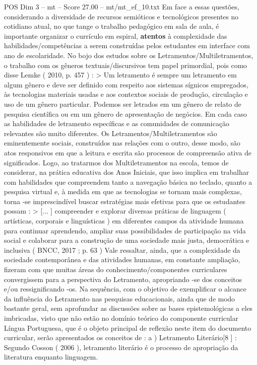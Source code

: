 \begin{textsample}{POS Dim 3 – mt – Score 27.00 – mt/mt\_ef\_10.txt}
Em face a essas questões, considerando a diversidade de recursos semióticos e tecnológicos presentes no cotidiano atual, no que tange o trabalho pedagógico em sala de aula, é importante organizar o currículo em espiral, \textbf{atentos} à complexidade das habilidades/competências a serem construídas pelos estudantes em interface com ano de escolaridade.
No bojo dos estudos sobre os Letramentos/Multiletramentos, o trabalho com os gêneros textuais/discursivos tem papel primordial, pois como disse Lemke ( 2010, p. 457 ) : > Um letramento é sempre um letramento em algum gênero e deve ser definido com respeito aos sistemas sígnicos empregados, às tecnologias materiais usadas e aos contextos sociais de produção, circulação e uso de um gênero particular.
Podemos ser letrados em um gênero de relato de pesquisa científica ou em um gênero de apresentação de negócios.
Em cada caso as habilidades de letramento específicas e as comunidades de comunicação relevantes são muito diferentes.
Os Letramentos/Multiletramentos são eminentemente sociais, construídos nas relações com o outro, desse modo, são atos responsivos em que a leitura e escrita são processos de compreensão ativa de significados.
Logo, ao tratarmos dos Multiletramentos na escola, temos de considerar, na prática educativa dos Anos Iniciais, que isso implica em trabalhar com habilidades que compreendem tanto a navegação básica no teclado, quanto a pesquisa virtual e, à medida em que as tecnologias se tornam mais complexas, torna -se imprescindível buscar estratégias mais efetivas para que os estudantes possam : > [... ] compreender e explorar diversas práticas de linguagem ( artísticas, corporais e linguísticas ) em diferentes campos da atividade humana para continuar aprendendo, ampliar suas possibilidades de participação na vida social e colaborar para a construção de uma sociedade mais justa, democrática e inclusiva ( BNCC, 2017 ; p. 63 ) Vale ressaltar, ainda, que a complexidade da sociedade contemporânea e das atividades humanas, em constante ampliação, fizeram com que muitas áreas do conhecimento/componentes curriculares convergissem para a perspectiva do Letramento, apropriando -se dos conceitos e/ou ressignificando -os.
Na sequência, com o objetivo de exemplificar o alcance da influência do Letramento nas pesquisas educacionais, ainda que de modo bastante geral, sem aprofundar as discussões sobre as bases epistemológicas a eles imbricadas, visto que não estão no domínio teórico do componente curricular Língua Portuguesa, que é o objeto principal de reflexão neste item do documento curricular, serão apresentados os conceitos de : a ) Letramento Literário[8 ] : Segundo Cosson ( 2006 ), letramento literário é o processo de apropriação da literatura enquanto linguagem.

\end{textsample}
